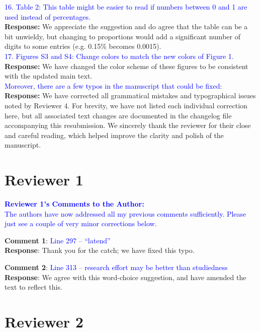\documentclass{article}
\begin{document}
\textcolor{blue}{16. Table 2: This table might be easier to read if numbers between 0 and 1 are used instead of percentages.} \\
\textbf{Response:} We appreciate the suggestion and do agree that the table can be a bit unwieldy, but changing to proportions would add a significant number of digits to some entries (e.g. 0.15\% becomes 0.0015). \\

\textcolor{blue}{17. Figures S3 and S4: Change colors to match the new colors of Figure 1.} \\
\textbf{Response:} We have changed the color scheme of these figures to be consistent with the updated main text.\\

\textcolor{blue}{Moreover, there are a few typos in the manuscript that could be fixed:} \\
\textbf{Response:} We have corrected all grammatical mistakes and typographical issues noted by Reviewer 4.  For brevity, we have not listed each individual correction here, but all associated text changes are documented in the changelog file accompanying this resubmission. We sincerely thank the reviewer for their close and careful reading, which helped improve the clarity and polish of the manuscript.

\section{Reviewer 1}
\textcolor{blue}{\textbf{Reviewer 1's Comments to the Author:} \\
The authors have now addressed all my previous comments sufficiently. Please just see a couple of very minor corrections below.} \newline

\textbf{Comment 1}: \textcolor{blue}{Line 297 – “latend”}
    \\
    \textbf{Response}: Thank you for the catch; we have fixed this typo. 

\textbf{Comment 2}: \textcolor{blue}{Line 313 – research effort may be better than studiedness}
\\
    \textbf{Response}: We agree with this word-choice suggestion, and have amended the text to reflect this.
\\

\section{Reviewer 2}
\end{document}
